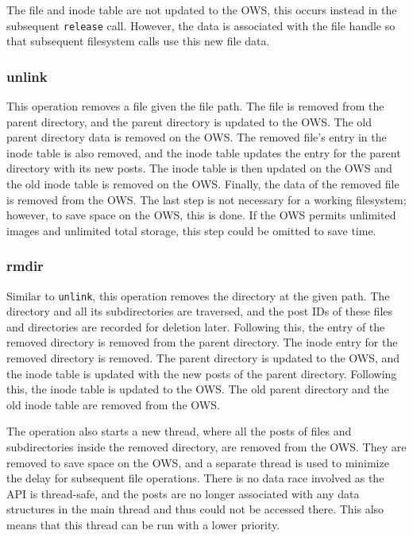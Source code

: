 The file and inode table are not updated to the \gls{OWS}, this occurs instead in the subsequent \texttt{release} call. However, the data is associated with the file handle so that subsequent filesystem calls use this new file data.

\subsubsection{unlink}
This operation removes a file given the file path. The file is removed from the parent directory, and the parent directory is updated to the \gls{OWS}. The old parent directory data is removed on the \gls{OWS}. The removed file's entry in the inode table is also removed, and the inode table updates the entry for the parent directory with its new posts. The inode table is then updated on the \gls{OWS} and the old inode table is removed on the \gls{OWS}. Finally, the data of the removed file is removed from the \gls{OWS}. The last step is not necessary for a working filesystem; however, to save space on the \gls{OWS}, this is done. If the \gls{OWS} permits unlimited images and unlimited total storage, this step could be omitted to save time.

\subsubsection{rmdir}
Similar to \texttt{unlink}, this operation removes the directory at the given path. The directory and all its subdirectories are traversed, and the post IDs of these files and directories are recorded for deletion later. Following this, the entry of the removed directory is removed from the parent directory. The inode entry for the removed directory is removed. The parent directory is updated to the \gls{OWS}, and the inode table is updated with the new posts of the parent directory. Following this, the inode table is updated to the \gls{OWS}. The old parent directory and the old inode table are removed from the \gls{OWS}.

The operation also starts a new thread, where all the posts of files and subdirectories inside the removed directory, are removed from the \gls{OWS}. They are removed to save space on the \gls{OWS}, and a separate thread is used to minimize the delay for subsequent file operations. There is no data race involved as the \gls{API} is \mbox{thread-safe}, and the posts are no longer associated with any data structures in the main thread and thus could not be accessed there. This also means that this thread can be run with a lower priority.

